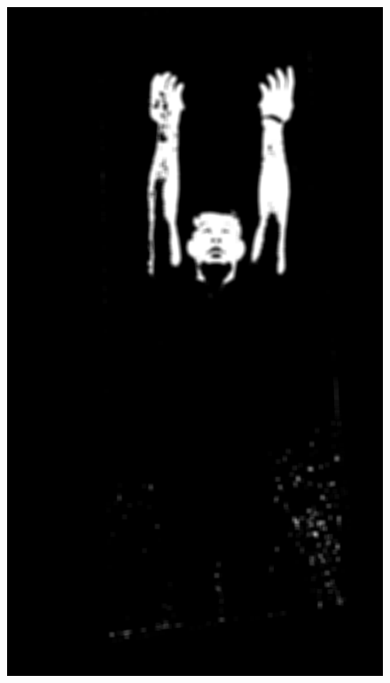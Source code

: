 \begin{figure}[!htbp]
    \centering
        \begin{minipage}{\sizeImg\textwidth}
            \includegraphics[width=\textwidth]{figuras/mao_barra/blur.png}
        \end{minipage}
        \begin{minipage}{\sizeImg\textwidth}

\end{minipage}
\end{figure}
